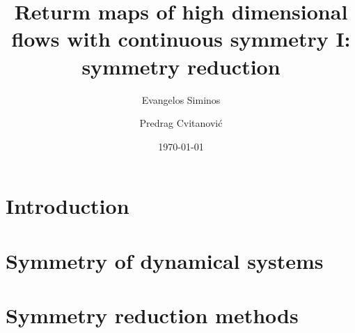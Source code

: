 \documentclass[aps,pre,preprint,groupedaddress]{revtex4}
\begin{document}
\title{Returm maps of high dimensional flows with continuous symmetry I: symmetry reduction}
\author{Evangelos Siminos}
\author{Predrag Cvitanovi\'c}

\date{\today}

\begin{abstract}
\end{abstract}

\pacs{}

\maketitle

\section{\label{s:intro} Introduction}
    

\subsection{\label{s:introCLE} \CLe}
    

\section{\label{s:symDyn} Symmetry of dynamical systems}
    

\section{\label{s:symRedGeneral} Symmetry reduction methods}
    
    
    
    
    
\end{document}
